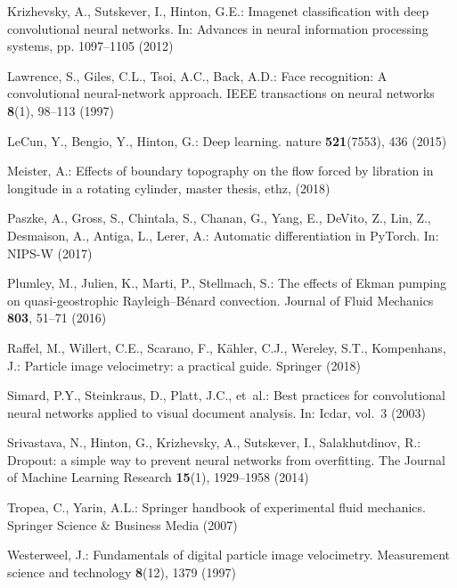 \documentclass{svjour3}                     %
\begin{document}
\begin{thebibliography}{17}
Krizhevsky, A., Sutskever, I., Hinton, G.E.: Imagenet classification with deep
  convolutional neural networks.
\newblock In: Advances in neural information processing systems, pp. 1097--1105
  (2012)

Lawrence, S., Giles, C.L., Tsoi, A.C., Back, A.D.: Face recognition: {A}
  convolutional neural-network approach.
\newblock IEEE transactions on neural networks \textbf{8}(1), 98--113 (1997)

LeCun, Y., Bengio, Y., Hinton, G.: Deep learning.
\newblock nature \textbf{521}(7553), 436 (2015)

Meister, A.: Effects of boundary topography on the flow forced by libration in
  longitude in a rotating cylinder, master thesis, ethz, (2018)

Paszke, A., Gross, S., Chintala, S., Chanan, G., Yang, E., DeVito, Z., Lin, Z.,
  Desmaison, A., Antiga, L., Lerer, A.: Automatic differentiation in
  {P}y{T}orch.
\newblock In: NIPS-W (2017)

Plumley, M., Julien, K., Marti, P., Stellmach, S.: The effects of {E}kman
  pumping on quasi-geostrophic {R}ayleigh--{B}{\'e}nard convection.
\newblock Journal of Fluid Mechanics \textbf{803}, 51--71 (2016)

Raffel, M., Willert, C.E., Scarano, F., K{\"a}hler, C.J., Wereley, S.T.,
  Kompenhans, J.: Particle image velocimetry: a practical guide.
\newblock Springer (2018)

Simard, P.Y., Steinkraus, D., Platt, J.C., et~al.: Best practices for
  convolutional neural networks applied to visual document analysis.
\newblock In: Icdar, vol.~3 (2003)

Srivastava, N., Hinton, G., Krizhevsky, A., Sutskever, I., Salakhutdinov, R.:
  Dropout: a simple way to prevent neural networks from overfitting.
\newblock The Journal of Machine Learning Research \textbf{15}(1), 1929--1958
  (2014)

Tropea, C., Yarin, A.L.: Springer handbook of experimental fluid mechanics.
\newblock Springer Science \& Business Media (2007)

Westerweel, J.: Fundamentals of digital particle image velocimetry.
\newblock Measurement science and technology \textbf{8}(12), 1379 (1997)

\end{thebibliography}
\end{document}
